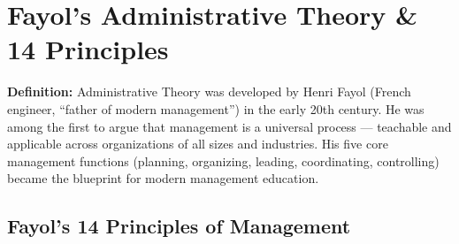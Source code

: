 \documentclass[11pt, letterpaper]{article}
\begin{document}
\newpage

\section{Fayol's Administrative Theory \& 14 Principles}

\begin{defbox}
\textbf{Definition:} Administrative Theory was developed by Henri Fayol (French engineer, ``father of modern management'') in the early 20th century. He was among the first to argue that management is a universal process --- teachable and applicable across organizations of all sizes and industries. His five core management functions (planning, organizing, leading, coordinating, controlling) became the blueprint for modern management education.
\end{defbox}

\subsection{Fayol's 14 Principles of Management}
\end{document}
